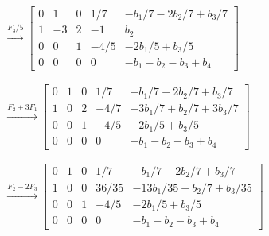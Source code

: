 \documentclass[handout]{beamer} %
\renewcommand{\_}[1]{_{\left[ #1 \right]}}
\renewcommand{\^}[1]{^{\left[ #1 \right]}}
\begin{document}
\begin{frame}

    {\footnotesize
    \begin{align*}
        &\stackrel{F_3/5}{\longrightarrow}
        \left[
            \begin{array}{cccc|c}
                0 & 1 & 0 & 1/7 & -b_1/7 -2 b_2/7 + b_3/7 \\
                1 & -3 & 2 & -1 & b_2 \\
                0 & 0 & 1 & -4/5 &-2b_1/5 + b_3/5 \\
                0 & 0 & 0 & 0 & -b_1 - b_2 - b_3 + b_4
            \end{array}
        \right]
        \\
        &{}^{}
        \\
        &\stackrel{F_2+3F_1}{\longrightarrow}
        \left[
            \begin{array}{cccc|c}
                0 & 1 & 0 & 1/7 & -b_1/7 -2 b_2/7 + b_3/7 \\
                1 & 0 & 2 & -4/7 & -3b_1/7 + b_2/7 + 3b_3/7 \\
                0 & 0 & 1 & -4/5 &-2b_1/5 + b_3/5 \\
                0 & 0 & 0 & 0 & -b_1 - b_2 - b_3 + b_4
            \end{array}
        \right]
        \\
        &{}^{}
        \\
        &\stackrel{F_2-2F_3}{\longrightarrow}
        \left[
            \begin{array}{cccc|c}
                0 & 1 & 0 & 1/7 & -b_1/7 -2 b_2/7 + b_3/7 \\
                1 & 0 & 0 & 36/35 & -13b_1/35 + b_2/7 + b_3/35 \\
                0 & 0 & 1 & -4/5 &-2b_1/5 + b_3/5 \\
                0 & 0 & 0 & 0 & -b_1 - b_2 - b_3 + b_4
            \end{array}
        \right]
    \end{align*}
    }
\end{frame}
\end{document}
